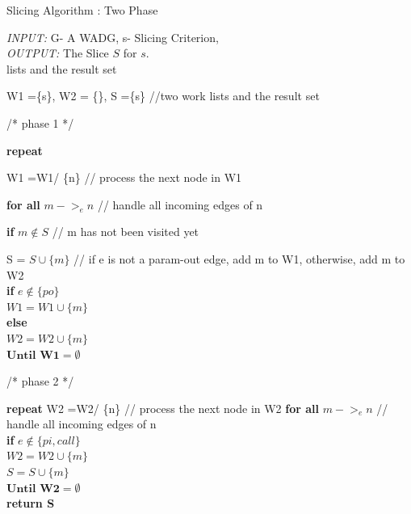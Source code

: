 \documentclass[11pt]{article}   %
\begin{document}
\begin{algorithm}
 
 \caption{Slicing Algorithm : Two Phase}
 
 \textit{INPUT:} G- A WADG, s- Slicing Criterion, \\
 
 \textit{OUTPUT:} The Slice $S$ for $s$.\\
 lists and the result set
 
 \begin{algorithmic}[1]
  \State \hspace{1cm}W1 =\{s\}, W2 = \{\}, S =\{s\} //two work lists and the result set
  
 /* phase 1 */ 
 
 \State \textbf{repeat}
 
 \State \hspace{1cm}W1 =W1/ \{n\} // process the next node in W1 

 \State \hspace{1cm}\textbf{for all} $m -> _{e} n$ // handle all incoming edges of n 
 
 \State \hspace{2cm}\textbf{if} $m \notin S$ // m has not been visited yet 
 
 \State \hspace{3cm}S = $S\cup\{m\}$ // if e is not a param-out edge, add m to W1, otherwise, add m to W2 \\
 \hspace{4cm}\textbf{if} $e \notin \{po\}$ \\
 \hspace{5cm}$W1 =W1 \cup \{m\}$\\
 \hspace{4cm}\textbf{else} \\
 \hspace{5cm}$W2 =W2 \cup \{m\}$\\
 \hspace{1cm}$\textbf{Until W1} = \emptyset$
 
  /* phase 2 */ 
  
 \State \textbf{repeat}
 \State \hspace{1cm}W2 =W2/ \{n\} // process the next node in W2 
 \State \hspace{1cm}\textbf{for all} $m -> _{e} n$ // handle all incoming edges of n\\
 \hspace{2cm}\textbf{if} $e \notin \{pi,call\}$\\
 \hspace{5cm}$W2 =W2 \cup \{m\}$\\
 \hspace{5cm}$S =S \cup \{m\}$\\
 \hspace{1cm}$\textbf{Until W2} = \emptyset$\\
  \hspace{1cm}\textbf{return S}\\
  
 \end{algorithmic}
 
\end{algorithm}
\end{document}
